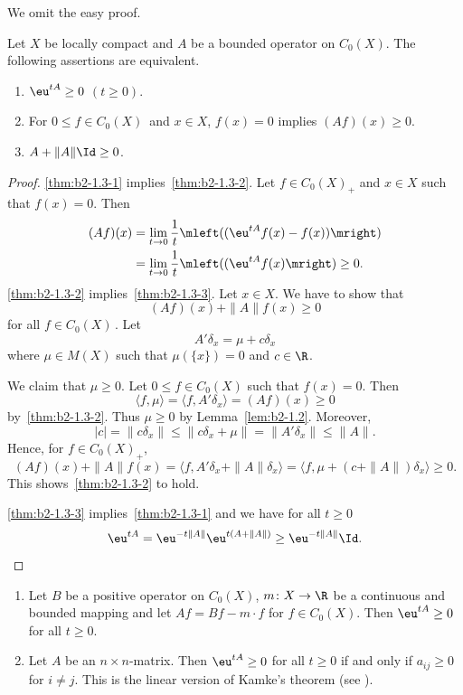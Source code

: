 We omit the easy proof.
\begin{theorem}\label{thm:b2-1.3}
Let $X$ be locally compact and $A$ be a bounded operator on $C_{0}(X)$.
The following assertions are equivalent.
\begin{enumerate}[\upshape (a)]
\item \label{thm:b2-1.3-1}
$\eu^{tA} \geq 0$ $(t \geq 0)$.
\item \label{thm:b2-1.3-2}
For  $0 \leq f \in C_{0}(X)$\, and  $x \in X$,  $f(x) = 0$ implies $(Af)(x) \geq 0$.
\item \label{thm:b2-1.3-3}
$A + \|A\|\Id \geq 0$.
\end{enumerate}
\end{theorem}
\begin{proof}
\ref{thm:b2-1.3-1} implies~\ref{thm:b2-1.3-2}.
Let $f \in C_{0}(X)_{+}$ and $x \in X$ such that $f(x) = 0$.
Then
\begin{align*}
(Af)(x) &= \lim_{t \to 0} \frac{1}{t} \mleft( (\eu^{tA}f(x) - f(x)) \mright) \\
&= \lim_{t \to 0}\frac{1}{t} \mleft( (\eu^{tA}f(x) \mright) \geq 0 .
\end{align*}
\ref{thm:b2-1.3-2} implies~\ref{thm:b2-1.3-3}.
Let $x \in X$.
We have to show that 
%
\[
	(Af)(x) + \|A\|f(x) \geq 0
\]
%
for all $f \in C_{0}(X)$\,.
Let 
%
\[
	A'\delta_{x} = \mu + c\delta_{x}
\]
%
where $\mu \in M(X)$ such that $\mu(\{x\}) = 0$ and $c \in \R$.

We claim that $\mu \geq 0$.
Let $0 \leq f \in C_{0}(X)$ such that $f(x) = 0$.
Then 
%
\[
	\langle f,\mu \rangle = \langle f,A'\delta_{x} \rangle = (Af)(x) \geq 0 
\]
%
by~\ref{thm:b2-1.3-2}.
Thus $\mu \geq 0$ by Lemma~\ref{lem:b2-1.2}.
Moreover, 
%
\[
	|c| = \|c\delta_{x}\| \leq \|c\delta_{x} + \mu\| = \|A'\delta_{x}\| \leq \|A\| .
\]
%
Hence, for $f \in C_{0}(X)_{+}$,
\[
(Af)(x) + \|A\|f(x) = \langle f, A'\delta_{x} + \|A\|\delta_{x} \rangle = \langle f, \mu + (c+\|A\|)\delta_{x} \rangle \geq 0.
\]
This shows~\ref{thm:b2-1.3-2} to hold.

\ref{thm:b2-1.3-3} implies~\ref{thm:b2-1.3-1} and we have for all $t \geq 0$
%
\[
	\eu^{tA} = \eu^{-t\|A\|}\eu^{t(A+\|A\|)} \geq \eu^{-t\|A\|}\Id .
	\qedhere
\]
%
\end{proof}
\begin{example}\label{ex:b2-1.4} 
 
\begin{enumerate}[\upshape (i), wide, labelindent=.5ex] 
\item \label{ex:b2-1.4-1}
Let $B$ be a positive operator on $C_{0}(X)$, $m \colon X \to \R$ be a continuous and bounded mapping and let $Af = Bf - m \cdot f$ for $f \in C_{0}(X)$.
Then $\eu^{tA} \geq 0$ for all $t \geq 0$.
		
\item \label{ex:b2-1.4-2}
Let $A$ be an $n \times n$-matrix.
Then $\eu^{tA} \geq 0$ for all $t \geq 0$ if and only if\/ $a_{ij} \geq 0$ for $i \neq j$.
This is the linear version of Kamke's theorem (see \textcite{kamke:1932}).
\end{enumerate}
\end{example}
